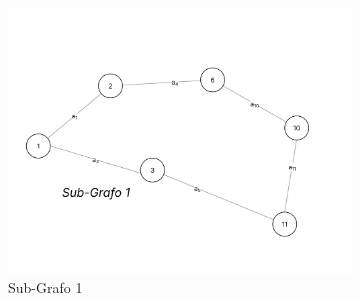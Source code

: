 \documentclass[
12pt,
a4paper,
semrecuonosumario,
sumario = abnt-6027-2012]{report}
\begin{document}
        \begin{figure}[!htb]
            \centering %

            \begin{subfigure}[b]{0.48\textwidth}
                \centering
                \includegraphics[width=\textwidth]{figuras/subgrafos/subgrafo1.png} %
                \caption{Sub-Grafo 1}
                \label{fig:imagem1}
            \end{subfigure}
            \hfill %
            \begin{subfigure}[b]{0.48\textwidth}
                \centering

\end{subfigure}
\end{figure}
\end{document}
